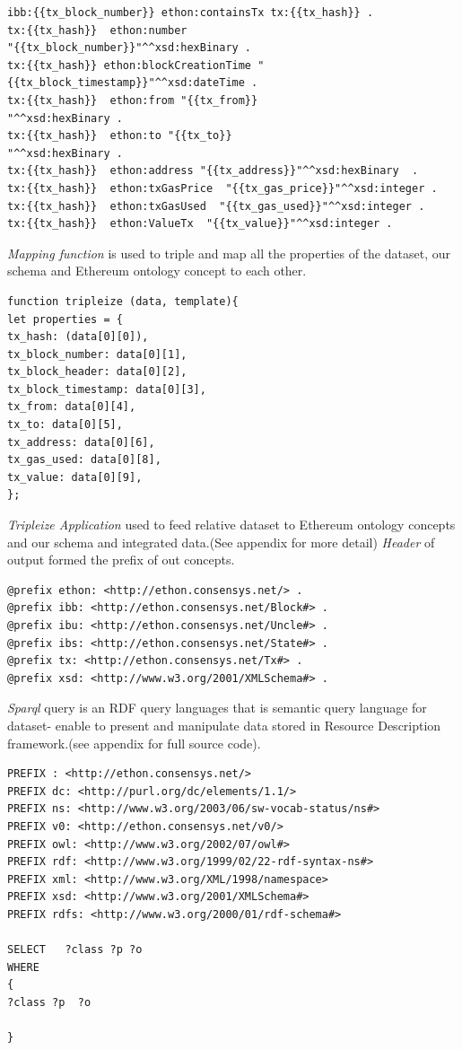 \begin{lstlisting}
ibb:{{tx_block_number}} ethon:containsTx tx:{{tx_hash}} .
tx:{{tx_hash}}  ethon:number 
"{{tx_block_number}}"^^xsd:hexBinary .
tx:{{tx_hash}} ethon:blockCreationTime "{{tx_block_timestamp}}"^^xsd:dateTime .    
tx:{{tx_hash}}  ethon:from "{{tx_from}}
"^^xsd:hexBinary .    
tx:{{tx_hash}}  ethon:to "{{tx_to}}
"^^xsd:hexBinary .    
tx:{{tx_hash}}  ethon:address "{{tx_address}}"^^xsd:hexBinary  .    
tx:{{tx_hash}}  ethon:txGasPrice  "{{tx_gas_price}}"^^xsd:integer .    
tx:{{tx_hash}}  ethon:txGasUsed  "{{tx_gas_used}}"^^xsd:integer .    
tx:{{tx_hash}}  ethon:ValueTx  "{{tx_value}}"^^xsd:integer .
\end{lstlisting}

\textit{Mapping function} is used to triple and map all the properties of the dataset, our schema and Ethereum ontology concept to each other.\\

\begin{lstlisting}
function tripleize (data, template){
let properties = {
tx_hash: (data[0][0]),
tx_block_number: data[0][1],
tx_block_header: data[0][2],
tx_block_timestamp: data[0][3],
tx_from: data[0][4],
tx_to: data[0][5],
tx_address: data[0][6],
tx_gas_used: data[0][8],
tx_value: data[0][9],
};
\end{lstlisting}

\textit{Tripleize Application} used to feed relative dataset to Ethereum ontology concepts and our schema and integrated data.(See appendix for more detail)
\textit{Header} of output formed the prefix of out concepts.
\begin{lstlisting}
@prefix ethon: <http://ethon.consensys.net/> .
@prefix ibb: <http://ethon.consensys.net/Block#> .
@prefix ibu: <http://ethon.consensys.net/Uncle#> .
@prefix ibs: <http://ethon.consensys.net/State#> .
@prefix tx: <http://ethon.consensys.net/Tx#> .
@prefix xsd: <http://www.w3.org/2001/XMLSchema#> .
\end{lstlisting}
\textit{Sparql} query is an RDF query languages that is semantic query language for dataset- enable to present and manipulate data  stored in Resource Description framework.(see appendix for full source code). \\

\begin{lstlisting}
PREFIX : <http://ethon.consensys.net/>
PREFIX dc: <http://purl.org/dc/elements/1.1/>
PREFIX ns: <http://www.w3.org/2003/06/sw-vocab-status/ns#>
PREFIX v0: <http://ethon.consensys.net/v0/>
PREFIX owl: <http://www.w3.org/2002/07/owl#>
PREFIX rdf: <http://www.w3.org/1999/02/22-rdf-syntax-ns#>
PREFIX xml: <http://www.w3.org/XML/1998/namespace>
PREFIX xsd: <http://www.w3.org/2001/XMLSchema#>
PREFIX rdfs: <http://www.w3.org/2000/01/rdf-schema#>

SELECT   ?class ?p ?o
WHERE
{
?class ?p  ?o

}

\end{lstlisting}

